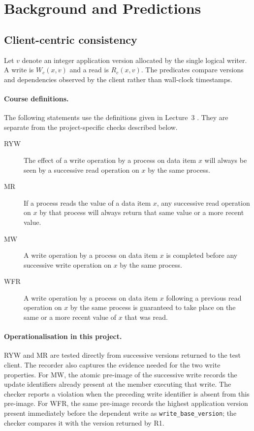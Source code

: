 \section{Background and Predictions}

\subsection{Client-centric consistency}

Let \(v\) denote an integer application version allocated by the single
logical writer. A write is \(W_c(x,v)\) and a read is \(R_c(x,v)\). The
predicates compare versions and dependencies observed by the client rather
than wall-clock timestamps.

\paragraph{Course definitions.}

\noindent
The following statements use the definitions given in Lecture~3 \cite{cai-lecture-3}. They are
separate from the project-specific checks described below.

\begin{description}
\item[RYW] The effect of a write operation by a process on data item \(x\) will
always be seen by a successive read operation on \(x\) by the same process.
\item[MR] If a process reads the value of a data item \(x\), any successive
read operation on \(x\) by that process will always return that same value or a
more recent value.
\item[MW] A write operation by a process on data item \(x\) is completed
before any successive write operation on \(x\) by the same process.
\item[WFR] A write operation by a process on data item \(x\) following a
previous read operation on \(x\) by the same process is guaranteed to take
place on the same or a more recent value of \(x\) that was read.
\end{description}

\paragraph{Operationalisation in this project.}
RYW and MR are tested directly from successive versions returned to the
test client. The recorder also captures the evidence needed for the two
write properties.
For MW, the atomic pre-image of the successive write records the update
identifiers already present at the member executing that write. The checker
reports a violation when the preceding write identifier is absent from this
pre-image. For WFR, the same pre-image records the highest application version
present immediately before the dependent write as
\texttt{write\_base\_version}; the checker compares it with the version
returned by R1.

